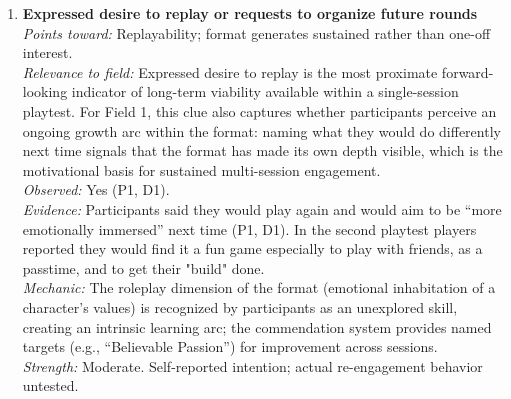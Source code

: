\begin{enumerate}
\item \textbf{Expressed desire to replay or requests to organize future rounds}\\
\textit{Points toward:} Replayability; format generates sustained rather than one-off interest.\\
\textit{Relevance to field:} Expressed desire to replay is the most proximate forward-looking indicator of long-term viability available within a single-session playtest. For Field 1, this clue also captures whether participants perceive an ongoing growth arc within the format: naming what they would do differently next time signals that the format has made its own depth visible, which is the motivational basis for sustained multi-session engagement.\\
\textit{Observed:} Yes (P1, D1).\\
\textit{Evidence:} Participants said they would play again and would aim to be ``more emotionally immersed'' next time (P1, D1). In the second playtest players reported they would find it a fun game especially to play with friends, as a passtime, and to get their "build" done.\\
\textit{Mechanic:} The roleplay dimension of the format (emotional inhabitation of a character's values) is recognized by participants as an unexplored skill, creating an intrinsic learning arc; the commendation system provides named targets (e.g., ``Believable Passion'') for improvement across sessions.\\
\textit{Strength:} Moderate. Self-reported intention; actual re-engagement behavior untested.


\end{enumerate}
